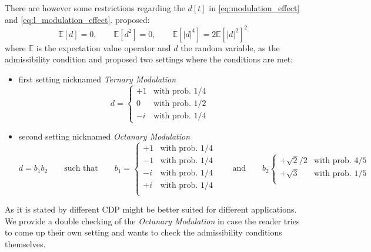 There are however some restrictions regarding the $d[t]$ in \cref{eq:modulation_effect} and \cref{eq:l_modulation_effect}. \cite{ECXLMS2013} proposed:
\begin{equation}
	\mathbb{E}\left[d\right] = 0, \qquad \mathbb{E}\left[d^2\right] = 0, \qquad\mathbb{E}\left[\left|d\right|^4\right] = 2\mathbb{E}\left[\left|d\right|^2\right]^2
\end{equation}
where $\mathbb{E}$ is the expectation value operator and $d$ the random variable, as the admissibility condition and proposed two settings where the conditions are met:
\begin{itemize}
	\item first setting nicknamed \emph{Ternary Modulation}
	\begin{equation*}
	  d =
		  \begin{cases}
			  +1 & \text{with prob.  $1/4$}\\
			  0 & \text{with prob.  $1/2$}\\
			  -i & \text{with prob.  $1/4$}
		  \end{cases}  
	\end{equation*}
	\item second setting nicknamed \emph{Octanary Modulation}
	\begin{equation*}
		d = b_1b_2 \qquad \text{such that} \qquad
	  b_1 =
		  \begin{cases}
			  +1 & \text{with prob.  $1/4$}\\
			  -1 & \text{with prob.  $1/4$}\\
			  -i & \text{with prob.  $1/4$}\\
			  +i & \text{with prob.  $1/4$}\\
	
		  \end{cases}  
		  \qquad \text{and} \qquad 
	  b_2 
		  \begin{cases}  
			+\sqrt{2}/2 & \text{with prob.  $4/5$}\\
			+\sqrt{3} & \text{with prob.  $1/5$}\\
		\end{cases}   
	\end{equation*}
\end{itemize}

As it is stated by \cite{ECXLMS2013} different \ac{CDP} might be better suited for different applications. We provide a double checking of the \emph{Octanary Modulation} 
in case the reader tries to come up their own setting and wants to check the admissibility conditions themselves. 

